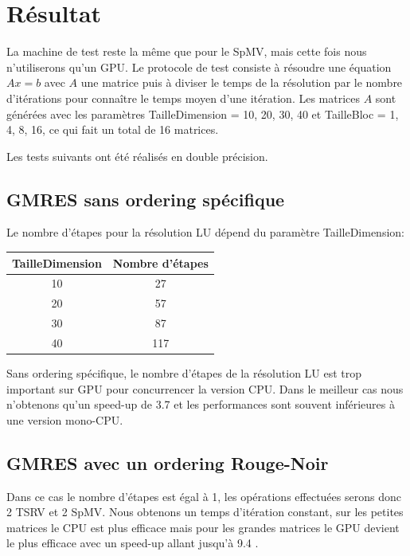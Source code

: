 \documentclass[a4paper,11pt]{report}
\begin{document}
 \section{Résultat}
  La machine de test reste la même que pour le SpMV, mais cette fois nous n'utiliserons
  qu'un GPU. Le protocole de test consiste à résoudre une équation
  $Ax=b$ avec $A$ une matrice puis à diviser le temps de la résolution
  par le nombre d'itérations pour connaître le temps moyen d'une itération.
  Les matrices $A$ sont générées
  avec les paramètres TailleDimension = {10, 20, 30, 40} et TailleBloc
  = {1, 4, 8, 16}, ce qui fait un total de 16 matrices.
  
  Les tests suivants ont été réalisés en double précision.
  
  \subsection{GMRES sans ordering spécifique}
   Le nombre d'étapes pour la résolution LU dépend du paramètre TailleDimension:
   \begin{center}
     \begin{tabular}{|c|c|}
       \hline
       TailleDimension & Nombre d'étapes \\
       \hline
       10 & 27 \\
       20 & 57 \\
       30 & 87 \\
       40 & 117 \\
       \hline
     \end{tabular}
   \end{center}
  Sans ordering spécifique, le nombre d'étapes de la résolution LU est
  trop important sur GPU pour concurrencer la version CPU. Dans le
  meilleur cas nous n'obtenons qu'un speed-up de 3.7 et les performances
  sont souvent inférieures à une version mono-CPU.
  



  \subsection{GMRES avec un ordering Rouge-Noir}
   Dans ce cas le nombre d'étapes est égal à 1, les opérations
   effectuées serons donc 2 TSRV et 2 SpMV.
   Nous obtenons un temps d'itération constant, sur les petites
   matrices le CPU est plus efficace mais pour les grandes matrices le
   GPU devient le plus efficace avec un speed-up allant jusqu'à 9.4 .   
  
\end{document}
